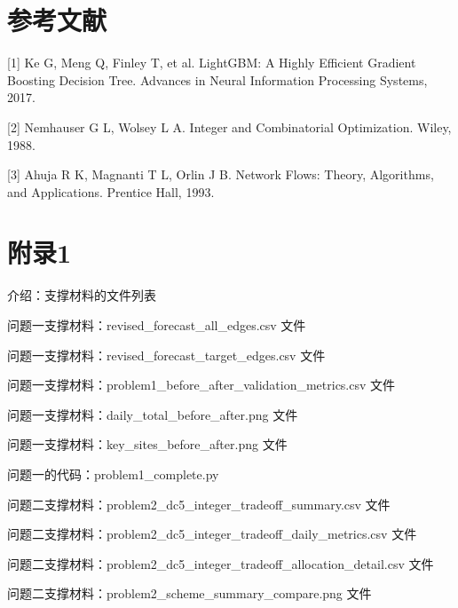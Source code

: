 \documentclass[UTF8,zihao=-4,a4paper,fontset=fandol]{ctexart}
\begin{document}
\section{参考文献}



[1] Ke G, Meng Q, Finley T, et al. LightGBM: A Highly Efficient Gradient Boosting Decision Tree. Advances in Neural Information Processing Systems, 2017.



[2] Nemhauser G L, Wolsey L A. Integer and Combinatorial Optimization. Wiley, 1988.



[3] Ahuja R K, Magnanti T L, Orlin J B. Network Flows: Theory, Algorithms, and Applications. Prentice Hall, 1993.



\section{附录1}



介绍：支撑材料的文件列表



问题一支撑材料：revised\_forecast\_all\_edges.csv 文件



问题一支撑材料：revised\_forecast\_target\_edges.csv 文件



问题一支撑材料：problem1\_before\_after\_validation\_metrics.csv 文件



问题一支撑材料：daily\_total\_before\_after.png 文件



问题一支撑材料：key\_sites\_before\_after.png 文件



问题一的代码：problem1\_complete.py



问题二支撑材料：problem2\_dc5\_integer\_tradeoff\_summary.csv 文件



问题二支撑材料：problem2\_dc5\_integer\_tradeoff\_daily\_metrics.csv 文件



问题二支撑材料：problem2\_dc5\_integer\_tradeoff\_allocation\_detail.csv 文件



问题二支撑材料：problem2\_scheme\_summary\_compare.png 文件
\end{document}
